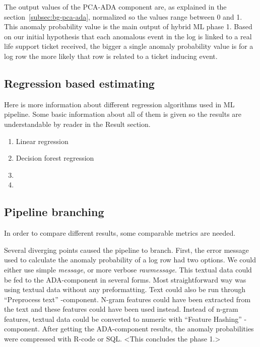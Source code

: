 The output values of the PCA-ADA component are,
as explained in the section~\ref{subsec:bg-pca-ada},
normalized so the values range between 0 and 1.
This anomaly probability value
is the main output of hybrid ML phase 1.
Based on our initial hypothesis
that each anomalous event in the log
is linked to a real life support ticket received,
the bigger a single anomaly probability value is for a log row
the more likely that row is related to a ticket inducing event.




\subsection{Regression based estimating}\label{subsec:pipe-regression-estimating}
\begin{itcomment}
    Here is more information about different regression algorithms
    used in ML pipeline.
    Some basic information about all of them is given so the results are understandable
    by reader in the Result section.
\end{itcomment}

\begin{enumerate}
    \item Linear regression
    \item Decision forest regression
    \item \etc
    \item \etc
\end{enumerate}



\subsection{Pipeline branching}\label{subsec:pipe-branching}

In order to compare different results,
some comparable metrics are needed.

Several diverging points caused the pipeline to branch.
First,
the error message used to calculate the anomaly probability of a log row
had two options.
We could either use simple \textit{message},
or more verbose \textit{rawmessage}.
This textual data could be fed to the ADA-component in several forms.
Most straightforward way was using textual data without any preformatting.
Text could also be run through \enquote{Preprocess text} -component. %
N-gram features could have been extracted from the text
and these features could have been used instead.
Instead of n-gram features,
textual data could be converted to numeric
with \enquote{Feature Hashing} -component.
After getting the ADA-component results,
the anomaly probabilities were compressed with R-code or SQL. %
<This concludes the phase 1.> %

